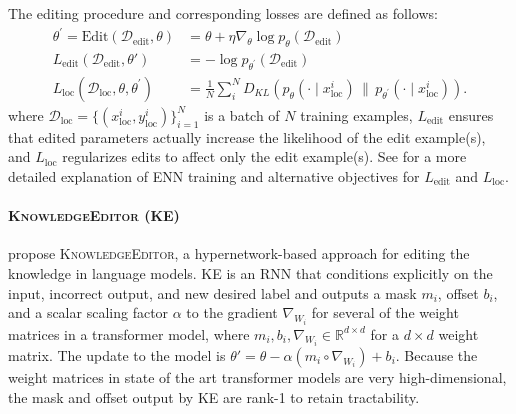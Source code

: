 \documentclass{article}
\begin{document}
The editing procedure and corresponding losses are defined as follows:
\begin{align}
    \label{eq:enn-edit}\theta^\prime = \text{Edit}(\mathcal{D}_\text{edit}, \theta) &= \theta + \eta \nabla_\theta \log p_\theta(\mathcal{D}_\text{edit}) \\
    \label{eq:enn-edit-outer} L_\text{edit}(\mathcal{D}_\text{edit}, \theta') &= -\log p_{\theta^\prime}(\mathcal{D}_\text{edit}) \\
    \label{eq:enn-loc} L_\text{loc}(\mathcal{D}_\text{loc}, \theta, \theta^\prime) &= \frac{1}{N}\sum_i^N D_{KL}(p_\theta(\cdot \mid x_\text{loc}^i)\,\|\, p_{\theta^\prime}(\cdot \mid x_\text{loc}^i)).
\end{align}
where $\mathcal{D}_\text{loc} = \{(x_\text{loc}^i, y_\text{loc}^i)\}_{i=1}^N$ is a batch of $N$ training examples, $ L_\text{edit}$ ensures that edited parameters actually increase the likelihood of the edit example(s), and $ L_\text{loc}$ regularizes edits to affect only the edit example(s). See \citet{Sinitsin2020Editable} for a more detailed explanation of ENN training and alternative objectives for $ L_\text{edit}$ and $ L_\text{loc}$.

\paragraph{\textsc{KnowledgeEditor} (KE)}
\cite{Cao2021EditingFK} propose \textsc{KnowledgeEditor}, a hypernetwork-based approach for editing the knowledge in language models. KE is an RNN that conditions explicitly on the input, incorrect output, and new desired label and outputs a mask $m_i$, offset $b_i$, and a scalar scaling factor $\alpha$ to the gradient $\nabla_{W_i}$ for several of the weight matrices in a transformer model, where $m_i,b_i,\nabla_{W_i} \in \mathbb{R}^{d \times d}$ for a $d \times d$ weight matrix. The update to the model is $\theta' = \theta - \alpha (m_i \circ \nabla_{W_i}) + b_i$. Because the weight matrices in state of the art transformer models are very high-dimensional, the mask and offset output by KE are rank-1 to retain tractability.
\end{document}
